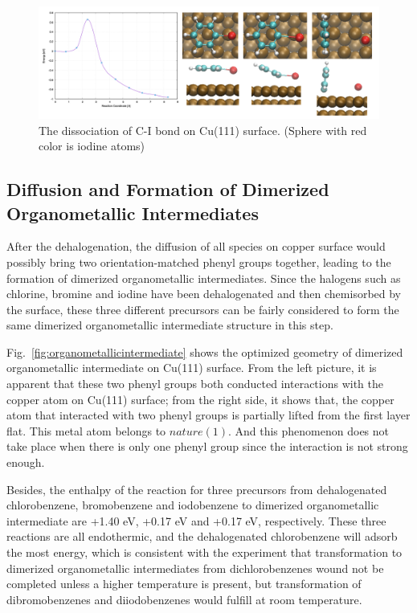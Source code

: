 \documentclass[%
 reprint,
 amsmath,amssymb,
 aps,
prb,
]{revtex4-2}
\begin{document}
\begin{figure}[hbt]
\centering
\includegraphics[width=1.0\textwidth]{Fig/dissociation_I.png}
\caption{The dissociation of C-I bond on Cu(111) surface. (Sphere with red color is iodine atoms)}
\label{fig:dissociation_I}
\end{figure}

\subsection{Diffusion and Formation of Dimerized Organometallic Intermediates}

After the dehalogenation, the diffusion of all species on copper surface would possibly bring two orientation-matched phenyl groups together, leading to the formation of dimerized organometallic intermediates. Since the halogens such as chlorine, bromine and iodine have been dehalogenated and then chemisorbed by the surface, these three different precursors can be fairly considered to form the same dimerized organometallic intermediate structure in this step.

Fig.~\ref{fig:organometallicintermediate} shows the optimized geometry of dimerized organometallic intermediate on Cu(111) surface. From the left picture, it is apparent that these two phenyl groups both conducted interactions with the copper atom on Cu(111) surface; from the right side, it shows that, the copper atom that interacted with two phenyl groups is partially lifted from the first layer flat. This metal atom belongs to $nature(1)$. And this phenomenon does not take place when there is only one phenyl group since the interaction is not strong enough. 

Besides, the enthalpy of the reaction for three precursors from dehalogenated chlorobenzene, bromobenzene and iodobenzene to dimerized organometallic intermediate are +1.40 eV, +0.17 eV and +0.17 eV, respectively. These three reactions are all endothermic, and the dehalogenated chlorobenzene will adsorb the most energy, which is consistent with the experiment that transformation to dimerized organometallic intermediates from dichlorobenzenes wound not be completed unless a higher temperature is present, but transformation of dibromobenzenes and diiodobenzenes would fulfill at room temperature.
\end{document}
